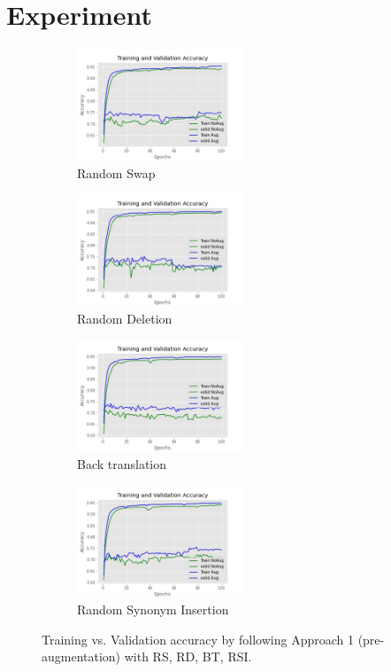 \documentclass{article}
\begin{document}
\section{Experiment}
\begin{figure}
  \begin{subfigure}{6cm}
    \centering\includegraphics[width=5cm]{accuracyrandomswapA1.jpg}
    \caption{Random Swap}
  \end{subfigure}
  \begin{subfigure}{6cm}
    \centering\includegraphics[width=5cm]{accuracyrandomdeleteA1.jpg}
    \caption{Random Deletion}
  \end{subfigure}
 
  \begin{subfigure}{6cm}
    \centering\includegraphics[width=5cm]{accuracybacktranslate.jpg}
    \caption{Back translation}
  \end{subfigure}
  \begin{subfigure}{6cm}
    \centering\includegraphics[width=5cm]{accuracyrandomInsertionA1.jpg}
    \caption{Random Synonym Insertion}
  \end{subfigure}
  \caption{Training vs. Validation accuracy by following Approach 1 (pre-augmentation) with RS, RD, BT, RSI.}
  \label{fig:preaugmentA1}
\end{figure}
\end{document}
